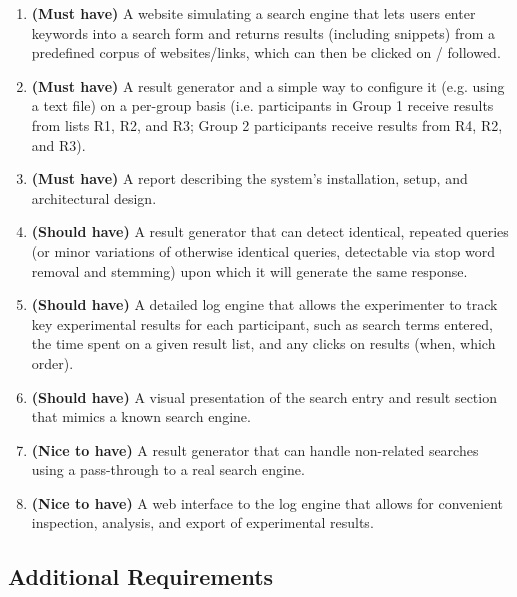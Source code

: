 \documentclass[a4paper]{usiinfbachelorproject}
\begin{document}
    \begin{enumerate}

        \item \textbf{(Must have)} A website simulating a search engine that lets users enter keywords into a search form and
              returns results (including snippets) from a predefined corpus of websites/links, which can then be clicked on / followed.

        \item \textbf{(Must have)} A result generator and a simple way to configure it (e.g. using a text file) on a per-group
              basis (i.e. participants in Group 1 receive results from lists R1, R2, and R3; Group 2 participants
              receive results from R4, R2, and R3).

        \item \textbf{(Must have)} A report describing the system's installation, setup, and architectural design. 

        \item \textbf{(Should have)} A result generator that can detect identical, repeated queries (or minor variations of
              otherwise identical queries, detectable via stop word removal and stemming) upon which it will generate the same response.

        \item \textbf{(Should have)} A detailed log engine that allows the experimenter to track key experimental results
              for each participant, such as search terms entered, the time spent on a given result list, and any clicks on
              results (when, which order).

        \item \textbf{(Should have)} A visual presentation of the search entry and result section that mimics a known search engine.  

        \item \textbf{(Nice to have)} A result generator that can handle non-related searches using a pass-through to a real search engine.

        \item \textbf{(Nice to have)} A web interface to the log engine that allows for convenient inspection, analysis,
              and export of experimental results.

    \end{enumerate}

\subsection{\textbf{Additional Requirements}} \label{sec:reqAdditional}
\end{document}
